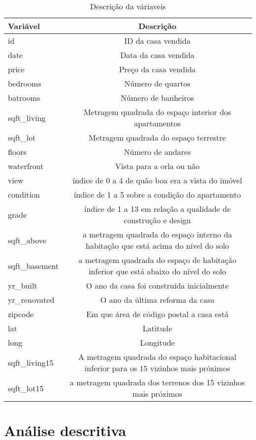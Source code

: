 \documentclass[
]{article}
\begin{document}
\begin{table}[H]
\caption{Descrição da váriaveis}\label{tab:tab0}
\centering
\begin{tabular}[t]{l|c}
\hline
Variável & Descrição\\
\hline
id & ID da casa vendida\\
\hline
date & Data da casa vendida\\
\hline
price & Preço da casa vendida\\
\hline
bedrooms & Número de quartos\\
\hline
batrooms & Número de banheiros \\
\hline
sqft_living & Metragem quadrada do espaço interior dos apartamentos\\
\hline
sqft_lot & Metragem quadrada do espaço terrestre\\
\hline
floors & Número de andares\\ 
\hline
waterfront &  Vista para a orla ou não\\
\hline
view  & índice de 0 a 4 de quão boa era a vista do imóvel\\
\hline
condition & índice de 1 a 5 sobre a condição do apartamento\\
  \hline
grade  & índice de 1 a 13 em relação a qualidade de construção e design\\
\hline
sqft_above  & a metragem quadrada do espaço interno da habitação que está acima do nível do solo\\
\hline
sqft_basement & a metragem quadrada do espaço de habitação inferior que está abaixo do nível do solo\\
\hline
yr_built  & O ano da casa foi construída inicialmente\\
\hline
yr_renovated  & O ano da última reforma da casa\\ 
\hline
zipcode & Em que área de código postal a casa está\\
\hline
lat & Latitude\\
\hline
long & Longitude\\
\hline
sqft_living15 & A metragem quadrada do espaço habitacional inferior para os 15 vizinhos mais próximos\\
\hline
sqft_lot15 & a metragem quadrada dos terrenos dos 15 vizinhos mais próximos\\
\hline
\end{tabular}
\end{table}

\hypertarget{anuxe1lise-descritiva}{%
\section{Análise descritiva}\label{anuxe1lise-descritiva}}
\end{document}
